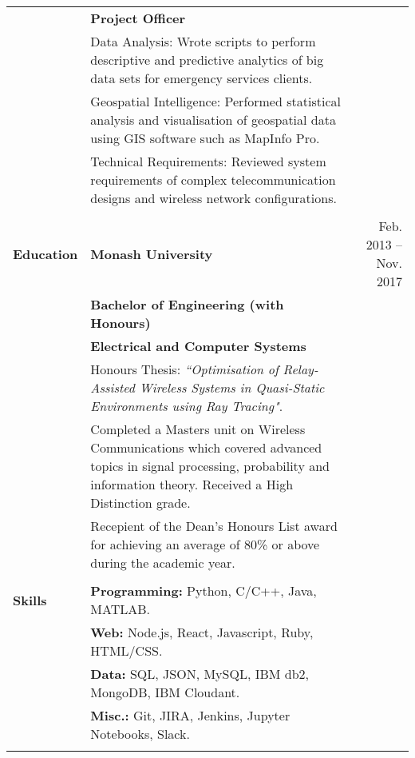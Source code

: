 \documentclass[a4paper,10pt]{letter}
\begin{document}
\begin{tabular}{ @{} p{2.5cm} p{12cm} r }
 & \textbf{Project Officer} & \\
\large
 & Data Analysis: Wrote scripts to perform descriptive and predictive analytics of big data sets for emergency services clients. & \\
 & Geospatial Intelligence: Performed statistical analysis and visualisation of geospatial data using GIS software such as MapInfo Pro. & \\
 & Technical Requirements: Reviewed system requirements of complex telecommunication designs and wireless network configurations. & \\
 & & \\
\large
\textbf{Education} & \textbf{Monash University} & \normalsize Feb. 2013 -- Nov. 2017 \\
 & \textbf{Bachelor of Engineering (with Honours)} & \\
 & \textbf{Electrical and Computer Systems} & \\
\large
 & Honours Thesis: \textit{``Optimisation of Relay-Assisted Wireless Systems in Quasi-Static Environments using Ray Tracing"}. & \\
 & Completed a Masters unit on Wireless Communications which covered advanced topics in signal processing, probability and information theory. Received a High Distinction grade. & \\
 & Recepient of the Dean's Honours List award for achieving an average of 80\% or above during the academic year. & \\
 & \\
\large
\textbf{Skills} & \textbf{Programming:} Python, C/C++, Java, MATLAB. & \\
 & \textbf{Web:} Node.js, React, Javascript, Ruby, HTML/CSS. & \\
 & \textbf{Data:} SQL, JSON, MySQL, IBM db2, MongoDB, IBM Cloudant. & \\
 & \textbf{Misc.:} Git, JIRA, Jenkins, Jupyter Notebooks, Slack. & \\
 & & 
\end{tabular}
\end{document}
